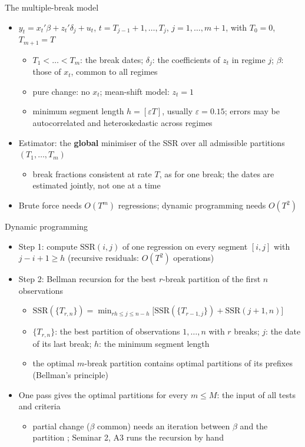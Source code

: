 \begin{frame}{The multiple-break model}
\itemsize{\small}
\begin{itemize}
    \item $y_t = x_t'\beta + z_t'\delta_j + u_t$, $t = T_{j-1} + 1, \dots, T_j$, $j = 1, \dots, m + 1$, with $T_0 = 0$, $T_{m+1} = T$ 
    \begin{itemize}
        \item $T_1 < \dots < T_m$: the break dates; $\delta_j$: the coefficients of $z_t$ in regime $j$; $\beta$: those of $x_t$, common to all regimes
        \item pure change: no $x_t$; mean-shift model: $z_t = 1$
        \item minimum segment length $h = [\varepsilon T]$, usually $\varepsilon = 0.15$; errors may be autocorrelated and heteroskedastic across regimes
    \end{itemize}
    \item Estimator: the \textbf{global} minimiser of the SSR over all admissible partitions $(T_1, \dots, T_m)$
    \begin{itemize}
        \item break fractions consistent at rate $T$, as for one break; the dates are estimated jointly, not one at a time
    \end{itemize}
    \item Brute force needs $O(T^m)$ regressions; dynamic programming needs $O(T^2)$ 
\end{itemize}
\end{frame}

\begin{frame}{Dynamic programming}
\itemsize{\small}
\begin{itemize}
    \item Step 1: compute $\mathrm{SSR}(i, j)$ of one regression on every segment $[i, j]$ with $j - i + 1 \ge h$ (recursive residuals: $O(T^2)$ operations)
    \item Step 2: Bellman recursion for the best $r$-break partition of the first $n$ observations
    \begin{itemize}
        \item $\mathrm{SSR}(\{T_{r,n}\}) = \min_{rh \le j \le n - h}\big[\mathrm{SSR}(\{T_{r-1,j}\}) + \mathrm{SSR}(j + 1, n)\big]$
        \item $\{T_{r,n}\}$: the best partition of observations $1, \dots, n$ with $r$ breaks; $j$: the date of its last break; $h$: the minimum segment length
        \item the optimal $m$-break partition contains optimal partitions of its prefixes (Bellman's principle)
    \end{itemize}
    \item One pass gives the optimal partitions for every $m \le M$: the input of all tests and criteria
    \begin{itemize}
        \item partial change ($\beta$ common) needs an iteration between $\beta$ and the partition ; Seminar 2, A3 runs the recursion by hand
    \end{itemize}
\end{itemize}
\end{frame}

